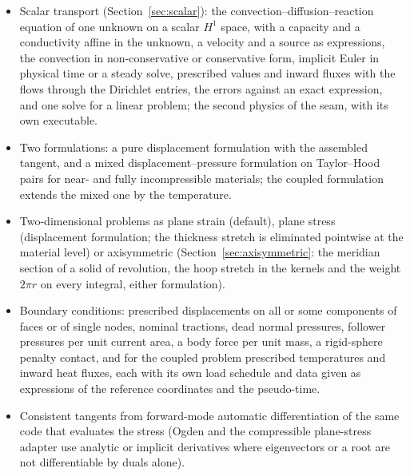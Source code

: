 \documentclass[11pt]{article}
\begin{document}
\begin{itemize}[nosep]
    decoupled model with the temperature as a second state variable
    (entropic shear modulus, thermal expansion through the volumetric law,
    Fourier conduction) and the heat equation with the thermoelastic
    heating, solved as a coupled displacement--pressure--temperature problem
    on Taylor--Hood spaces in physical time, with prescribed temperatures
    and heat fluxes per current area as boundary conditions.
  \item Scalar transport (Section~\ref{sec:scalar}): the
    convection--diffusion--reaction equation of one unknown on a scalar
    $H^1$ space, with a capacity and a conductivity affine in the unknown,
    a velocity and a source as expressions, the convection in
    non-conservative or conservative form, implicit Euler in physical time
    or a steady solve, prescribed values and inward fluxes with the flows
    through the Dirichlet entries, the errors against an exact expression,
    and one solve for a linear problem; the second physics of the seam,
    with its own executable.
  \item Two formulations: a pure displacement formulation with the
    assembled tangent, and a mixed displacement--pressure formulation on
    Taylor--Hood pairs for near- and fully incompressible materials; the
    coupled formulation extends the mixed one by the temperature.
  \item Two-dimensional problems as plane strain (default), plane stress
    (displacement formulation; the thickness stretch is eliminated
    pointwise at the material level) or axisymmetric (Section~\ref{sec:axisymmetric}:
    the meridian section of a solid of revolution, the hoop stretch in the
    kernels and the weight $2\pi r$ on every integral, either formulation).
  \item Boundary conditions: prescribed displacements on all or some
    components of faces or of single nodes, nominal tractions, dead normal
    pressures, follower pressures per unit current area, a body force per
    unit mass, a rigid-sphere penalty contact, and for the coupled problem
    prescribed temperatures and inward heat fluxes, each with its own load
    schedule and data given as expressions of the reference coordinates and
    the pseudo-time.
  \item Consistent tangents from forward-mode automatic differentiation of
    the same code that evaluates the stress (Ogden and the compressible
    plane-stress adapter use analytic or implicit derivatives where
    eigenvectors or a root are not differentiable by duals alone).

\end{itemize}
\end{document}
